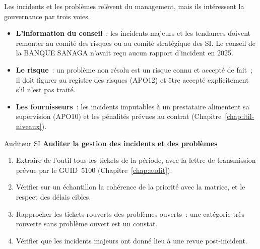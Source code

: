 Les incidents et les problèmes relèvent du management, mais ils
intéressent la gouvernance par trois voies.
\begin{itemize}
    \item \textbf{L'information du conseil}~: les incidents majeurs et les
          tendances doivent remonter au comité des risques ou au comité
          stratégique des SI. Le conseil de la BANQUE SANAGA n'avait reçu
          aucun rapport d'incident en 2025.
    \item \textbf{Le risque}~: un problème non résolu est un risque connu
          et accepté de fait~; il doit figurer au registre des risques
          (APO12) et être accepté explicitement s'il n'est pas traité.
    \item \textbf{Les fournisseurs}~: les incidents imputables à un
          prestataire alimentent sa supervision (APO10) et les pénalités
          prévues au contrat (Chapitre~\ref{chap:itil-niveaux}).
\end{itemize}

\begin{boxmetier}{Auditeur SI}
\textbf{Auditer la gestion des incidents et des problèmes}
\begin{enumerate}
    \item Extraire de l'outil tous les tickets de la période, avec la
          lettre de transmission prévue par le GUID~5100
          (Chapitre~\ref{chap:audit}).
    \item Vérifier sur un échantillon la cohérence de la priorité avec la
          matrice, et le respect des délais cibles.
    \item Rapprocher les tickets rouverts des problèmes ouverts~: une
          catégorie très rouverte sans problème ouvert est un constat.
    \item Vérifier que les incidents majeurs ont donné lieu à une revue
          post-incident.
\end{enumerate}
\end{boxmetier}

\separateur

